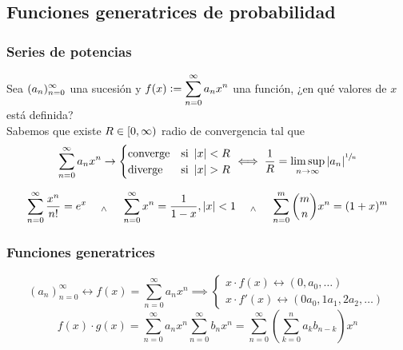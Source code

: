 \subsection{Funciones generatrices de probabilidad}
\subsubsection{Series de potencias}
Sea $\displaystyle (a_n)_{n=0}^\infty$ una sucesión y $\displaystyle f(x)\vcentcolon=\sum_{n=0}^\infty a_nx^n$ una función, ¿en qué valores de $x$ está definida?\\
Sabemos que existe $\displaystyle R \in [0, \infty)$ radio de convergencia tal que
\[\sum_{n=0}^\infty a_nx^n \rightarrow \begin{cases}
		\textrm{converge} & \textrm{si } \left|x\right| < R \\
		\textrm{diverge}  & \textrm{si } \left|x\right| > R
	\end{cases} \iff \frac{1}{R}=\limsup_{n\to\infty}\left|a_n\right|^{\sfrac{1}{n}}\]
\begin{ejem}
	\[ \sum_{n=0}^\infty \frac{x^n}{n!} = e^x \quad\; _{\wedge} \;\quad \sum_{n=0}^\infty x^n = \frac{1}{1-x}, \left|x\right|<1 \quad\; _{\wedge} \;\quad \sum_{n=0}^m \binom{m}{n} x^n = (1+x)^m\]
\end{ejem}

\subsubsection{Funciones generatrices}
\[(a_n)_{n=0}^\infty \longleftrightarrow f(x)=\sum_{n=0}^\infty a_n x^n \implies \begin{cases}
		x\cdot f(x) \longleftrightarrow (0, a_0, \dots) \\
		x\cdot f'(x) \longleftrightarrow (0a_0, 1a_1, 2a_2, \dots)
	\end{cases}\]
\[f(x) \cdot g(x) = \sum_{n=0}^\infty a_n x^n \sum_{n=0}^\infty b_n x^n = \sum_{n=0}^\infty \left(\sum_{k=0}^n a_k b_{n-k}\right)x^n\]

